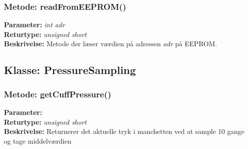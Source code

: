 \subsubsection{Metode: readFromEEPROM()}
\textbf{Parameter: } \textit{int adr}
\\ \textbf{Returtype: } \textit{unsigned short}
\\ \textbf{Beskrivelse: }  Metode der læser værdien på adressen \textit{adr} på EEPROM. 

\subsection{Klasse: PressureSampling}

\subsubsection{Metode: getCuffPressure()}
\textbf{Parameter: } 
\\ \textbf{Returtype: } \textit{unsigned short }
\\ \textbf{Beskrivelse: } Returnerer det aktuelle tryk i manchetten ved at sample 10 gange og tage middelværdien

